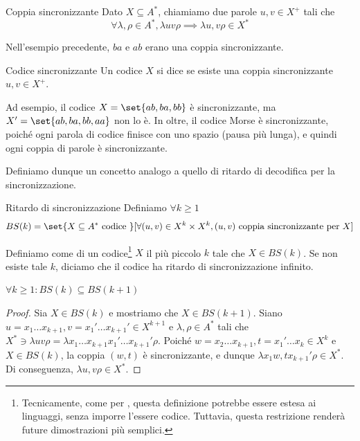\begin{definition}{Coppia sincronizzante}
  Dato \(X\subseteq A^*\), chiamiamo  due parole \(u,v \in X^+\) tali che
  \[\forall \lambda,\rho \in A^*, \lambda u v \rho \implies \lambda u, v\rho \in X^*\]
\end{definition}

Nell'esempio precedente, $ba$ e $ab$ erano una coppia sincronizzante.

\begin{definition}{Codice sincronizzante}
  Un codice \(X\) si dice  se esiste una coppia sincronizzante \(u,v \in X^+\).
\end{definition}

Ad esempio, il codice \(X = \set{ab,ba,bb}\) è sincronizzante, ma \(X' = \set{ab,ba,bb,aa}\) non lo è.
In oltre, il codice Morse è sincronizzante, poiché ogni parola di codice finisce con uno spazio (pausa più lunga), e quindi ogni coppia di parole è sincronizzante.

Definiamo dunque un concetto analogo a quello di ritardo di decodifica per la sincronizzazione.

\begin{definition}{Ritardo di sincronizzazione}
  Definiamo \(\forall k \geq 1\)
  \[BS(k) = \set{X \subseteq A^* \text{ codice }}[\forall (u,v) \in X^k\times X^k, (u,v) \text{ coppia sincronizzante per } X]\]
  
  Definiamo come  di un codice\footnote{Tecnicamente, come per , questa definizione potrebbe essere estesa ai linguaggi, senza imporre l'essere codice. Tuttavia, questa restrizione renderà future dimostrazioni più semplici.} \(X\) il più piccolo \(k\) tale che \(X \in BS(k)\). Se non esiste tale \(k\), diciamo che il codice ha ritardo di sincronizzazione infinito.
\end{definition}

\begin{proposition}{}
  \(\forall k \geq 1: BS(k)\subseteq BS(k+1)\)
\end{proposition}

\begin{proof}{}
  Sia \(X \in BS(k)\) e mostriamo che \(X \in BS(k+1)\).
  Siano \(u = x_1\ldots x_{k+1},v = x_1'\ldots x_{k+1}' \in X^{k+1}\) e \(\lambda, \rho \in A^*\) tali che
  \(X^* \ni \lambda uv \rho = \lambda x_1\ldots x_{k+1}  x_1'\ldots x_{k+1}' \rho\). 
  Poiché \(w = x_2\ldots x_{k+1}, t = x_1'\ldots x_k \in X^k\) e \(X \in BS(k)\), la coppia \((w, t)\) è sincronizzante, e dunque \(\lambda x_1 w, t x_{k+1}' \rho \in X^*\).
  Di conseguenza, \(\lambda u, v \rho \in X^*\).
\end{proof}


